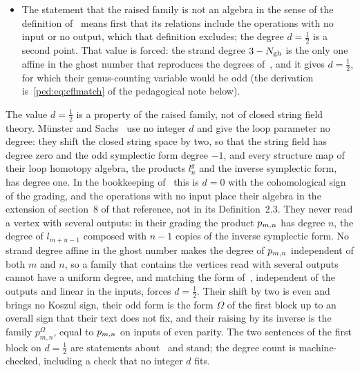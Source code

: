\begin{itemize}
  \item The statement that the raised family is not an \IBL{} algebra in the sense of the definition of~\cite{Cieliebak:2015:HomologicalAlgebraRelated} means first that its relations include the operations with no input or no output, which that definition excludes; the degree $d = \tfrac{1}{2}$ is a second point.
    That value is forced: the strand degree $3 - N_{\text{gh}}$ is the only one affine in the ghost number that reproduces the degrees of~\cite{Cieliebak:2015:HomologicalAlgebraRelated}, and it gives $d = \tfrac{1}{2}$, for which their genus-counting variable would be odd (the derivation is~\eqref{ped:eq:cflmatch} of the pedagogical note below).
\end{itemize}

\noindent{} The value $d = \tfrac{1}{2}$ is a property of the raised family, not of closed string field theory.
Münster and Sachs~\cite{Muenster:2013:QuantumOpenClosedHomotopy} use no integer $d$ and give the loop parameter no degree: they shift the closed string space by two, so that the string field has degree zero and the odd symplectic form degree $-1$, and every structure map of their loop homotopy algebra, the products $l_n^g$ and the inverse symplectic form, has degree one.
In the bookkeeping of~\cite{Cieliebak:2015:HomologicalAlgebraRelated} this is $d = 0$ with the cohomological sign of the grading, and the operations with no input place their algebra in the extension of section~8 of that reference, not in its Definition~2.3.
They never read a vertex with several outputs: in their grading the product $p_{m,n}$ has degree $n$, the degree of $l_{m + n - 1}$ composed with $n - 1$ copies of the inverse symplectic form.
No strand degree affine in the ghost number makes the degree of $p_{m,n}$ independent of both $m$ and $n$, so a family that contains the vertices read with several outputs cannot have a uniform degree, and matching the form of~\cite{Cieliebak:2015:HomologicalAlgebraRelated}, independent of the outputs and linear in the inputs, forces $d = \tfrac{1}{2}$.
Their shift by two is even and brings no Koszul sign, their odd form is the form $\Omega$ of the first block up to an overall sign that their text does not fix, and their raising by its inverse is the family $p^{\Omega}_{m, n}$, equal to $p_{m,n}$ on inputs of even parity.
The two sentences of the first block on $d = \tfrac{1}{2}$ are statements about~\cite{Cieliebak:2015:HomologicalAlgebraRelated} and stand; the degree count is machine-checked, including a check that no integer $d$ fits.

